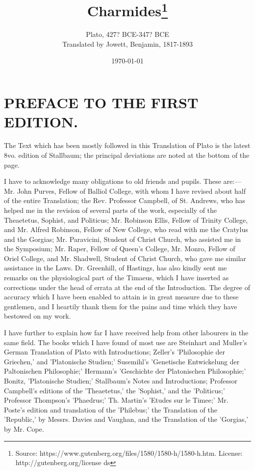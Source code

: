 \documentclass[11pt,letter]{article}
\begin{document}
\title{Charmides\thanks{Source: https://www.gutenberg.org/files/1580/1580-h/1580-h.htm. License: http://gutenberg.org/license ds}}
\date{\today}
\author{Plato, 427? BCE-347? BCE\\ Translated by Jowett, Benjamin, 1817-1893}
\maketitle

\setcounter{tocdepth}{1}
\tableofcontents
\renewcommand{\baselinestretch}{1.0}
\normalsize
\newpage

\section{
      PREFACE TO THE FIRST EDITION.
    }
\par  The Text which has been mostly followed in this Translation of Plato is the latest 8vo. edition of Stallbaum; the principal deviations are noted at the bottom of the page.

\par  I have to acknowledge many obligations to old friends and pupils. These are:—Mr. John Purves, Fellow of Balliol College, with whom I have revised about half of the entire Translation; the Rev. Professor Campbell, of St. Andrews, who has helped me in the revision of several parts of the work, especially of the Theaetetus, Sophist, and Politicus; Mr. Robinson Ellis, Fellow of Trinity College, and Mr. Alfred Robinson, Fellow of New College, who read with me the Cratylus and the Gorgias; Mr. Paravicini, Student of Christ Church, who assisted me in the Symposium; Mr. Raper, Fellow of Queen's College, Mr. Monro, Fellow of Oriel College, and Mr. Shadwell, Student of Christ Church, who gave me similar assistance in the Laws. Dr. Greenhill, of Hastings, has also kindly sent me remarks on the physiological part of the Timaeus, which I have inserted as corrections under the head of errata at the end of the Introduction. The degree of accuracy which I have been enabled to attain is in great measure due to these gentlemen, and I heartily thank them for the pains and time which they have bestowed on my work.

\par  I have further to explain how far I have received help from other labourers in the same field. The books which I have found of most use are Steinhart and Muller's German Translation of Plato with Introductions; Zeller's 'Philosophie der Griechen,' and 'Platonische Studien;' Susemihl's 'Genetische Entwickelung der Paltonischen Philosophie;' Hermann's 'Geschichte der Platonischen Philosophie;' Bonitz, 'Platonische Studien;' Stallbaum's Notes and Introductions; Professor Campbell's editions of the 'Theaetetus,' the 'Sophist,' and the 'Politicus;' Professor Thompson's 'Phaedrus;' Th. Martin's 'Etudes sur le Timee;' Mr. Poste's edition and translation of the 'Philebus;' the Translation of the 'Republic,' by Messrs. Davies and Vaughan, and the Translation of the 'Gorgias,' by Mr. Cope.
\end{document}
